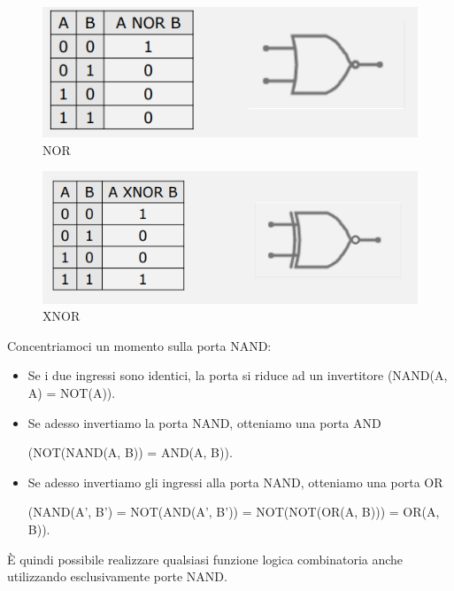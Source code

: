 \documentclass{article}
\begin{document}
\begin{figure}[h]
  \centering
  \includegraphics[scale=0.7]{IM_NOR}
  \caption{NOR}
  \label{NOR}
\end{figure}

\begin{figure}[h]
  \centering
  \includegraphics[scale=0.7]{IM_XNOR}
  \caption{XNOR}
  \label{XNOR}
\end{figure}

\clearpage

Concentriamoci un momento sulla porta NAND:

\vspace{1mm}

\begin{itemize}
  \item Se i due ingressi sono identici, la porta si riduce ad un invertitore (NAND(A, A) = NOT(A)).
  \item Se adesso invertiamo la porta NAND, otteniamo una porta AND 
  \begin{center}
    (NOT(NAND(A, B)) = AND(A, B)).
  \end{center}
  \item Se adesso invertiamo gli ingressi alla porta NAND, otteniamo una porta OR 
  \begin{center}
    (NAND(A', B') = NOT(AND(A', B')) = NOT(NOT(OR(A, B))) = OR(A, B)).
  \end{center}
\end{itemize}

È quindi possibile realizzare qualsiasi funzione logica combinatoria anche utilizzando esclusivamente porte NAND. 
\end{document}
